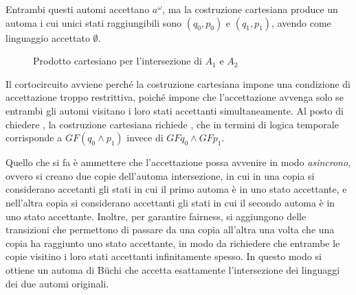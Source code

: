 Entrambi questi automi accettano \(a^\omega\), ma la costruzione cartesiana produce un automa i cui unici stati raggiungibili sono \((q_0, p_0)\) e \((q_1, p_1)\), avendo come linguaggio accettato \(\emptyset\).

\begin{figure}[H]
  \centering
  \caption{Prodotto cartesiano per l'intersezione di \(A_1\) e \(A_2\)}\label{fig:buchi_cartesian_intersection}
\end{figure}

Il cortocircuito avviene perché la costruzione cartesiana impone una condizione di accettazione troppo restrittiva, poiché impone che l'accettazione avvenga solo se entrambi gli automi visitano i loro stati accettanti simultaneamente. Al posto di chiedere , la costruzione cartesiana richiede , che in termini di logica temporale corrisponde a \(GF(q_0 \land p_1)\) invece di \(GF q_0 \land GF p_1\).

Quello che si fa è ammettere che l'accettazione possa avvenire in modo \textit{asincrono}, ovvero si creano due copie dell'automa intersezione, in cui in una copia si considerano accetanti gli stati in cui il primo automa è in uno stato accettante, e nell'altra copia si considerano accettanti gli stati in cui il secondo automa è in uno stato accettante. Inoltre, per garantire fairness, si aggiungono delle transizioni che permettono di passare da una copia all'altra una volta che una copia ha raggiunto uno stato accettante, in modo da richiedere che entrambe le copie visitino i loro stati accettanti infinitamente spesso. In questo modo si ottiene un automa di Büchi che accetta esattamente l'intersezione dei linguaggi dei due automi originali.

